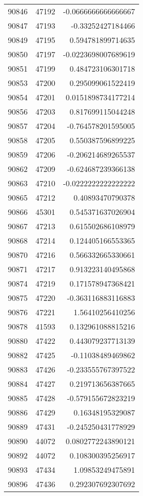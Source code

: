 \begin{tabular}{r | r | r}
90846 & 47192 & -0.0666666666666667 \\
90847 & 47193 & -0.33252427184466 \\
90849 & 47195 & 0.594781899714635 \\
90850 & 47197 & -0.0223698007689619 \\
90851 & 47199 & 0.484723106301718 \\
90853 & 47200 & 0.295099061522419 \\
90854 & 47201 & 0.0151898734177214 \\
90856 & 47203 & 0.817699115044248 \\
90857 & 47204 & -0.764578201595005 \\
90858 & 47205 & 0.550387596899225 \\
90859 & 47206 & -0.206214689265537 \\
90862 & 47209 & -0.624687239366138 \\
90863 & 47210 & -0.0222222222222222 \\
90865 & 47212 & 0.40893470790378 \\
90866 & 45301 & 0.545371637026904 \\
90867 & 47213 & 0.615502686108979 \\
90868 & 47214 & 0.124405166553365 \\
90870 & 47216 & 0.566332665330661 \\
90871 & 47217 & 0.913223140495868 \\
90874 & 47219 & 0.171578947368421 \\
90875 & 47220 & -0.363116883116883 \\
90876 & 47221 & 1.56410256410256 \\
90878 & 41593 & 0.132961088815216 \\
90880 & 47422 & 0.443079237713139 \\
90882 & 47425 & -0.11038489469862 \\
90883 & 47426 & -0.233555767397522 \\
90884 & 47427 & 0.219713656387665 \\
90885 & 47428 & -0.579155672823219 \\
90886 & 47429 & 0.16348195329087 \\
90889 & 47431 & -0.245250431778929 \\
90890 & 44072 & 0.0802772243890121 \\
90892 & 44072 & 0.108300395256917 \\
90893 & 47434 & 1.09853249475891 \\
90896 & 47436 & 0.292307692307692 \\

\end{tabular}

